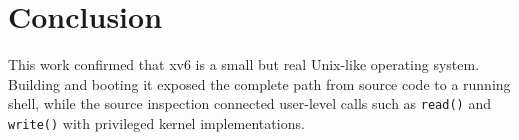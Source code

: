 \documentclass[12pt,a4paper]{article}
\begin{document}
\section{Conclusion}
This work confirmed that xv6 is a small but real Unix-like operating system. Building and booting it exposed the complete path from source code to a running shell, while the source inspection connected user-level calls such as \texttt{read()} and \texttt{write()} with privileged kernel implementations.
\end{document}
